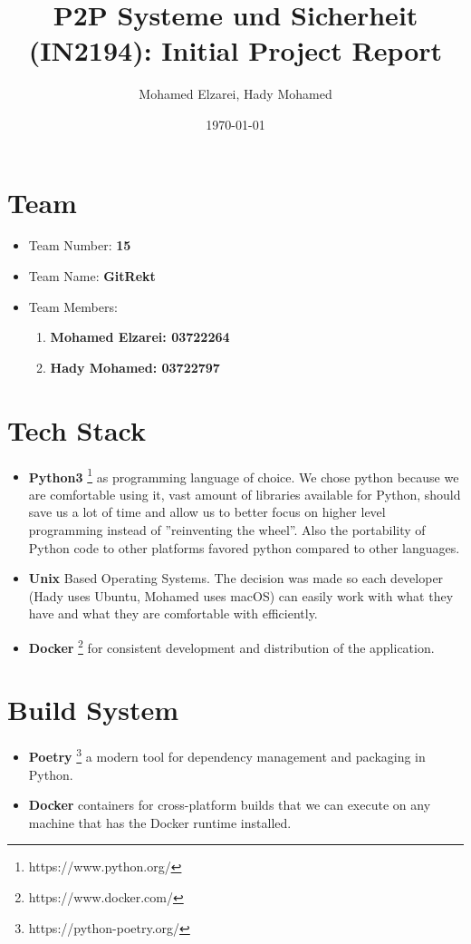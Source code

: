 \documentclass[a4paper,12pt]{extarticle}
\title{P2P Systeme und Sicherheit (IN2194): Initial Project Report}
\author{Mohamed Elzarei, Hady Mohamed}
\date{\today}
\begin{document}
\maketitle

\section{Team}
\begin{itemize}
    \item Team Number: \textbf{15}
    \item Team Name: \textbf{GitRekt}
    \item Team Members:
    \begin{enumerate}
        \item \textbf{Mohamed Elzarei: 03722264}
        \item \textbf{Hady Mohamed: 03722797}
    \end{enumerate}
\end{itemize}
\section{Tech Stack}
\begin{itemize}
    \item \textbf{Python3} \footnote{https://www.python.org/} as programming language of choice. We chose python because we are comfortable using it, vast amount of libraries available for Python, should save us a lot of time and allow us to better focus on higher level programming instead of ”reinventing the wheel”. Also the portability of Python code to other platforms favored python compared to other languages.
    
    \item \textbf{Unix} Based Operating Systems. The decision was made so each developer (Hady uses Ubuntu, Mohamed uses macOS) can easily work with what they have and what they are comfortable with efficiently.
    
    \item \textbf{Docker} \footnote{https://www.docker.com/} for consistent development and distribution of the application.
\end{itemize}
\section{Build System}
 \begin{itemize}
     \item \textbf{Poetry} \footnote{https://python-poetry.org/} a modern tool for dependency management and packaging in Python.
     
     \item \textbf{Docker} containers for cross-platform builds that we can execute on any machine that has the Docker runtime installed.
 \end{itemize}
\end{document}
